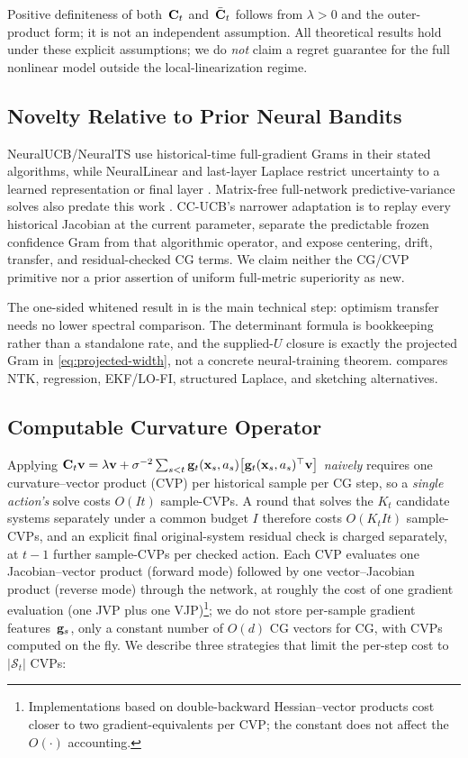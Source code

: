 Positive definiteness of both~$\mathbf{C}_t$ and~$\bar{\mathbf{C}}_t$ follows from
$\lambda>0$ and the outer-product form; it is not an independent assumption.
All theoretical results hold under these explicit assumptions; we do
\emph{not} claim a regret guarantee for the full nonlinear model outside
the local-linearization regime.



\subsection{Novelty Relative to Prior Neural Bandits}\label{sec:novelty}

NeuralUCB/NeuralTS use historical-time full-gradient Grams in their stated
algorithms, while NeuralLinear and last-layer Laplace restrict uncertainty to a
learned representation or final layer
\citep{zhou2020neural,zhang2021neural,riquelme2018deep,kristiadi2020being}.
Matrix-free full-network predictive-variance solves also predate this work
\citep{maddox2021fast}.  CC-UCB's narrower adaptation is to replay every
historical Jacobian at the current parameter, separate the predictable frozen
confidence Gram from that algorithmic operator, and expose centering, drift,
transfer, and residual-checked CG terms.  We claim neither the CG/CVP primitive
nor a prior assertion of uniform full-metric superiority as new.

The one-sided whitened result in  is the main technical
step: optimism transfer needs no lower spectral comparison.  The determinant
formula is bookkeeping rather than a standalone rate, and the supplied-$U$
closure is exactly the projected Gram in \eqref{eq:projected-width}, not a
concrete neural-training theorem.   compares NTK, regression,
EKF/LO-FI, structured Laplace, and sketching alternatives.



\subsection{Computable Curvature Operator}\label{sec:curvop}

Applying $\mathbf{C}_t\mathbf{v} = \lambda\mathbf{v} + \sigma^{-2}\sum_{s<t}\mathbf{g}_t(\mathbf{x}_s,a_s)\bigl[\mathbf{g}_t(\mathbf{x}_s,a_s)^\top\mathbf{v}\bigr]$
\emph{naively} requires one curvature--vector product (CVP) per historical
sample per CG step, so a \emph{single action's} solve costs $O(It)$
sample-CVPs.  A round that solves the $K_t$ candidate systems separately under a
common budget $I$ therefore costs $O(K_tIt)$ sample-CVPs, and an explicit final
original-system residual check is charged separately, at $t{-}1$ further
sample-CVPs per checked action.
Each CVP evaluates one Jacobian--vector product (forward mode) followed by
one vector--Jacobian product (reverse mode) through the network, at roughly
the cost of one gradient evaluation (one JVP plus one VJP)\footnote{Implementations based on double-backward Hessian--vector
products cost closer to two gradient-equivalents per CVP; the constant
does not affect the $O(\cdot)$ accounting.}; we do not store
per-sample gradient features~$\mathbf{g}_s$, only a constant number of $O(d)$ CG vectors
for CG, with CVPs computed on the fly.
We describe three strategies that limit the per-step cost to $|\mathcal{S}_t|$
CVPs:


